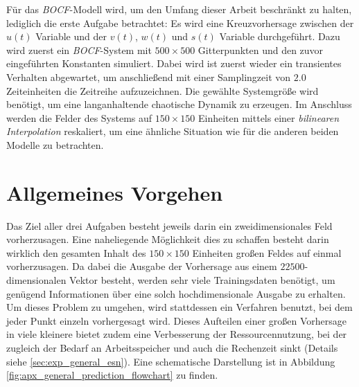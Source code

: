 Für das \textit{BOCF}-Modell wird, um den Umfang dieser Arbeit beschränkt zu halten, lediglich die erste Aufgabe betrachtet: Es wird eine Kreuzvorhersage zwischen der $u(t)$ Variable und der $v(t)$, $w(t)$ und $s(t)$ Variable durchgeführt. Dazu wird zuerst ein \textit{BOCF}-System mit $500 \times 500$ Gitterpunkten und den zuvor eingeführten Konstanten simuliert. Dabei wird ist zuerst wieder ein transientes Verhalten abgewartet, um anschließend mit einer Samplingzeit von $2.0$ Zeiteinheiten die Zeitreihe aufzuzeichnen. Die gewählte Systemgröße wird benötigt, um eine langanhaltende chaotische Dynamik zu erzeugen. Im Anschluss werden die Felder des Systems auf $150 \times 150$ Einheiten mittels einer \textit{bilinearen Interpolation} reskaliert, um eine ähnliche Situation wie für die anderen beiden Modelle zu betrachten. 

\section{Allgemeines Vorgehen}
\label{sc:experiments_general}
Das Ziel aller drei Aufgaben besteht jeweils darin ein zweidimensionales Feld vorherzusagen. Eine naheliegende Möglichkeit dies zu schaffen besteht darin wirklich den gesamten Inhalt des $150 \times 150$ Einheiten großen Feldes auf einmal vorherzusagen. Da dabei die Ausgabe der Vorhersage aus einem $22500$-dimensionalen Vektor besteht, werden sehr viele Trainingsdaten benötigt, um genügend Informationen über eine solch hochdimensionale Ausgabe zu erhalten. Um dieses Problem zu umgehen, wird stattdessen ein Verfahren benutzt, bei dem jeder Punkt einzeln vorhergesagt wird. Dieses Aufteilen einer großen Vorhersage in viele kleinere bietet zudem eine Verbesserung der Ressourcennutzung, bei der zugleich der Bedarf an Arbeitsspeicher und auch die Rechenzeit sinkt (Details siehe \ref{sec:exp_general_esn}). Eine schematische Darstellung ist in Abbildung \ref{fig:apx_general_prediction_flowchart} zu finden.\\

